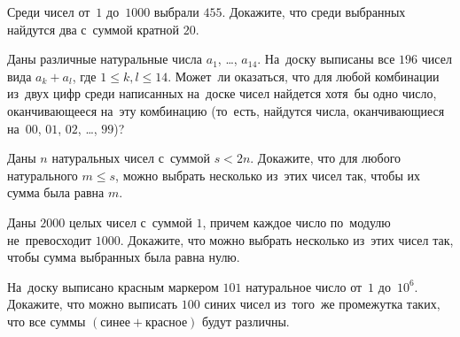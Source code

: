 


\begin{problems}

\item
Среди чисел от~$1$ до~$1000$ выбрали $455$.
Докажите, что среди выбранных найдутся два с~суммой кратной $20$.

\item
Даны различные натуральные числа $a_{1}$, \ldots, $a_{14}$.
На~доску выписаны все $196$ чисел вида $a_{k} + a_{l}$, где
$1 \leq k, l \leq 14$.
Может~ли оказаться, что для любой комбинации из~двух цифр среди написанных
на~доске чисел найдется хотя~бы одно число, оканчивающееся на~эту комбинацию
(то~есть, найдутся числа, оканчивающиеся на~$00$, $01$, $02$, \ldots, $99$)?

\item
Даны $n$ натуральных чисел с~суммой $s < 2 n$.
Докажите, что для любого натурального $m \leq s$, можно выбрать несколько
из~этих чисел так, чтобы их сумма была равна $m$.

\item
Даны $2000$ целых чисел с~суммой $1$, причем каждое число по~модулю
не~превосходит $1000$.
Докажите, что можно выбрать несколько из~этих чисел так, чтобы сумма выбранных
была равна нулю.

\item
На~доску выписано красным маркером $101$ натуральное число от~$1$ до~$10^{6}$.
Докажите, что можно выписать $100$ синих чисел из~того~же промежутка таких, что
все суммы $(\text{синее} + \text{красное})$ будут различны.

\end{problems}

